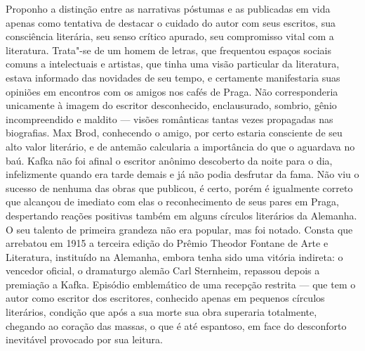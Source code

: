 Proponho a distinção entre as narrativas póstumas e as publicadas em
vida apenas como tentativa de destacar o cuidado do autor com seus
escritos, sua consciência literária, seu senso crítico apurado, seu
compromisso vital com a literatura. Trata"-se de um homem de letras,
que frequentou espaços sociais comuns a intelectuais e artistas, que
tinha uma visão particular da literatura, estava informado das
novidades de seu tempo, e certamente manifestaria suas opiniões em
encontros com os amigos nos cafés de Praga. Não corresponderia
unicamente à imagem do escritor desconhecido, enclausurado, sombrio,
gênio incompreendido e maldito --- visões românticas tantas vezes
propagadas nas biografias. Max Brod, conhecendo o amigo, por certo
estaria consciente de seu alto valor literário, e de antemão calcularia
a importância do que o aguardava no baú. Kafka não foi afinal o
escritor anônimo descoberto da noite para o dia, infelizmente quando
era tarde demais e já não podia desfrutar da fama. Não viu o sucesso de
nenhuma das obras que publicou, é certo, porém é igualmente correto que
alcançou de imediato com elas o reconhecimento de seus pares em Praga,
despertando reações positivas também em alguns círculos literários da
Alemanha. O seu talento de primeira grandeza não era popular, mas
foi notado. Consta que arrebatou em 1915 a terceira edição do Prêmio
Theodor Fontane de Arte e Literatura, instituído na Alemanha, embora
tenha sido uma vitória indireta: o vencedor oficial, o dramaturgo
alemão Carl Sternheim, repassou depois a premiação a Kafka. Episódio
emblemático de uma recepção restrita --- que tem o autor como escritor dos
escritores, conhecido apenas em pequenos círculos literários, condição
que após a sua morte sua obra superaria totalmente, chegando ao coração
das massas, o que é até espantoso, em face do desconforto inevitável
provocado por sua leitura.

